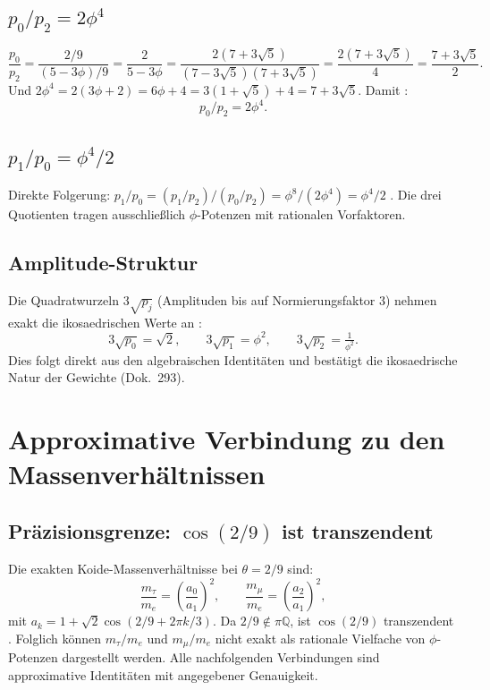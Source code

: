 \subsection{$p_0/p_2 = 2\phi^4$}

\[
  \frac{p_0}{p_2} = \frac{2/9}{(5-3\phi)/9} = \frac{2}{5-3\phi}
  = \frac{2(7+3\sqrt5)}{(7-3\sqrt5)(7+3\sqrt5)} = \frac{2(7+3\sqrt5)}{4} = \frac{7+3\sqrt5}{2}.
\]
Und $2\phi^4 = 2(3\phi+2) = 6\phi+4 = 3(1+\sqrt5)+4 = 7+3\sqrt5$. Damit \BM:
\[
  \boxed{p_0/p_2 = 2\phi^4.}
\]

\subsection{$p_1/p_0 = \phi^4/2$}

Direkte Folgerung: $p_1/p_0 = (p_1/p_2)/(p_0/p_2) = \phi^8/(2\phi^4) = \phi^4/2$ \BM.
Die drei Quotienten tragen ausschließlich $\phi$-Potenzen mit rationalen Vorfaktoren.

\subsection{Amplitude-Struktur}

Die Quadratwurzeln $3\sqrt{p_j}$ (Amplituden bis auf Normierungsfaktor 3) nehmen
exakt die ikosaedrischen Werte an \BM:
\[
  3\sqrt{p_0}=\sqrt2, \qquad 3\sqrt{p_1}=\phi^2, \qquad 3\sqrt{p_2}=\tfrac{1}{\phi^2}.
\]
Dies folgt direkt aus den algebraischen Identitäten und bestätigt die ikosaedrische
Natur der Gewichte (Dok.~293).

\section{Approximative Verbindung zu den Massenverhältnissen}

\subsection{Präzisionsgrenze: $\cos(2/9)$ ist transzendent}

Die exakten Koide-Massenverhältnisse bei $\theta=2/9$ sind:
\[
  \frac{m_\tau}{m_e} = \left(\frac{a_0}{a_1}\right)^2, \qquad
  \frac{m_\mu}{m_e} = \left(\frac{a_2}{a_1}\right)^2,
\]
mit $a_k = 1+\sqrt2\cos(2/9+2\pi k/3)$. Da $2/9\notin\pi\mathbb{Q}$, ist
$\cos(2/9)$ transzendent \EM. Folglich können $m_\tau/m_e$ und $m_\mu/m_e$ nicht
exakt als rationale Vielfache von $\phi$-Potenzen dargestellt werden. Alle
nachfolgenden Verbindungen sind approximative Identitäten mit angegebener Genauigkeit.

